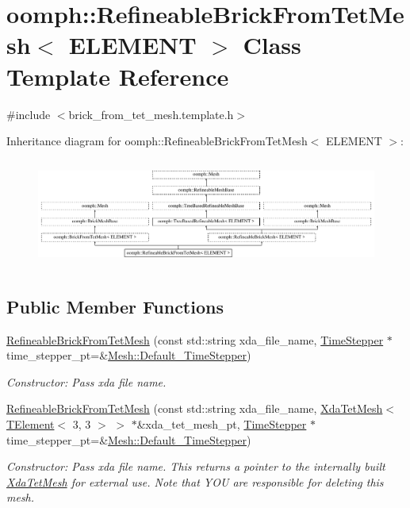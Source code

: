 \hypertarget{classoomph_1_1RefineableBrickFromTetMesh}{}\section{oomph\+:\+:Refineable\+Brick\+From\+Tet\+Mesh$<$ E\+L\+E\+M\+E\+NT $>$ Class Template Reference}
\label{classoomph_1_1RefineableBrickFromTetMesh}


{\ttfamily \#include $<$brick\+\_\+from\+\_\+tet\+\_\+mesh.\+template.\+h$>$}

Inheritance diagram for oomph\+:\+:Refineable\+Brick\+From\+Tet\+Mesh$<$ E\+L\+E\+M\+E\+NT $>$\+:\begin{figure}[H]
\begin{center}
\leavevmode
\includegraphics[height=3.601286cm]{classoomph_1_1RefineableBrickFromTetMesh}
\end{center}
\end{figure}
\subsection*{Public Member Functions}
\begin{DoxyCompactItemize}
\item 
\hyperlink{classoomph_1_1RefineableBrickFromTetMesh_ad46067054ab0f2d078171060956821b4}{Refineable\+Brick\+From\+Tet\+Mesh} (const std\+::string xda\+\_\+file\+\_\+name, \hyperlink{classoomph_1_1TimeStepper}{Time\+Stepper} $\ast$time\+\_\+stepper\+\_\+pt=\&\hyperlink{classoomph_1_1Mesh_a12243d0fee2b1fcee729ee5a4777ea10}{Mesh\+::\+Default\+\_\+\+Time\+Stepper})
\begin{DoxyCompactList}\small\item\em Constructor\+: Pass xda file name. \end{DoxyCompactList}\item 
\hyperlink{classoomph_1_1RefineableBrickFromTetMesh_a108febc7390d0c449d6dbd4a514c173e}{Refineable\+Brick\+From\+Tet\+Mesh} (const std\+::string xda\+\_\+file\+\_\+name, \hyperlink{classoomph_1_1XdaTetMesh}{Xda\+Tet\+Mesh}$<$ \hyperlink{classoomph_1_1TElement}{T\+Element}$<$ 3, 3 $>$ $>$ $\ast$\&xda\+\_\+tet\+\_\+mesh\+\_\+pt, \hyperlink{classoomph_1_1TimeStepper}{Time\+Stepper} $\ast$time\+\_\+stepper\+\_\+pt=\&\hyperlink{classoomph_1_1Mesh_a12243d0fee2b1fcee729ee5a4777ea10}{Mesh\+::\+Default\+\_\+\+Time\+Stepper})
\begin{DoxyCompactList}\small\item\em Constructor\+: Pass xda file name. This returns a pointer to the internally built \hyperlink{classoomph_1_1XdaTetMesh}{Xda\+Tet\+Mesh} for external use. Note that Y\+OU are responsible for deleting this mesh. \end{DoxyCompactList}\end{DoxyCompactItemize}
